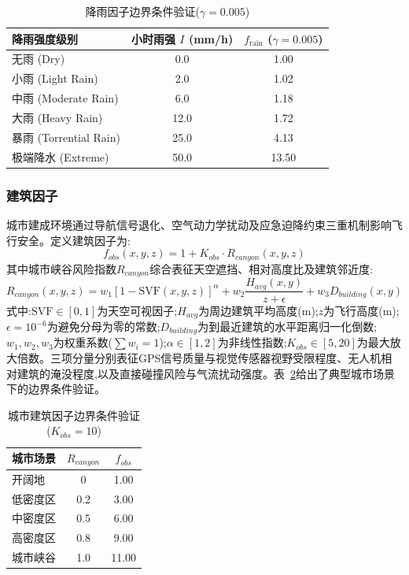 \begin{table}[htbp]
\centering
\caption{降雨因子边界条件验证($\gamma=0.005$)}
\label{tab:rainfall} %
\begin{tabular}{l c c}
\toprule
\textbf{降雨强度级别} & \textbf{小时雨强 $I$ (mm/h)} & \textbf{$f_{\text{rain}}$ ($\gamma=0.005$)} \\
\midrule
无雨 (Dry) & 0.0 & 1.00 \\
小雨 (Light Rain) & 2.0 & 1.02 \\
中雨 (Moderate Rain) & 6.0 & 1.18 \\
大雨 (Heavy Rain) & 12.0 & 1.72 \\
暴雨 (Torrential Rain) & 25.0 & 4.13 \\
极端降水 (Extreme) & 50.0 & 13.50 \\
\bottomrule
\end{tabular}
\end{table}

\subsubsection[Static Urban Building Factor]{建筑因子}
\label{subsubsec:f_obs}

城市建成环境通过导航信号退化、空气动力学扰动及应急迫降约束三重机制影响飞行安全。定义建筑因子为:
\begin{equation}
f_{obs}(x,y,z) = 1 + K_{obs} \cdot R_{canyon}(x,y,z)
\label{eq:f_obs}
\end{equation}
其中城市峡谷风险指数$R_{canyon}$综合表征天空遮挡、相对高度比及建筑邻近度:
\begin{equation}
R_{canyon}(x,y,z) = w_1 [1 - \text{SVF}(x,y,z)]^\alpha + w_2 \frac{H_{avg}(x,y)}{z + \epsilon} + w_3 D_{building}(x,y)
\label{eq:r_canyon}
\end{equation}
式中:$\text{SVF} \in [0,1]$为天空可视因子;$H_{avg}$为周边建筑平均高度(m);$z$为飞行高度(m);$\epsilon=10^{-6}$为避免分母为零的常数;$D_{building}$为到最近建筑的水平距离归一化倒数;$w_1,w_2,w_3$为权重系数($\sum w_i=1$);$\alpha \in [1,2]$为非线性指数;$K_{obs} \in [5,20]$为最大放大倍数。三项分量分别表征GPS信号质量与视觉传感器视野受限程度、无人机相对建筑的淹没程度,以及直接碰撞风险与气流扰动强度。表~\ref{tab:urban_validation}给出了典型城市场景下的边界条件验证。

\begin{table}[htbp]
\centering
\caption{城市建筑因子边界条件验证($K_{obs}=10$)}
\label{tab:urban_validation}
\begin{tabular}{l c c}
\toprule
\textbf{城市场景} & \textbf{$R_{canyon}$} & \textbf{$f_{obs}$} \\
\midrule
开阔地 & 0 & 1.00 \\
低密度区 & 0.2 & 3.00 \\
中密度区 & 0.5 & 6.00 \\
高密度区 & 0.8 & 9.00 \\
城市峡谷 & 1.0 & 11.00 \\
\bottomrule
\end{tabular}
\end{table}

